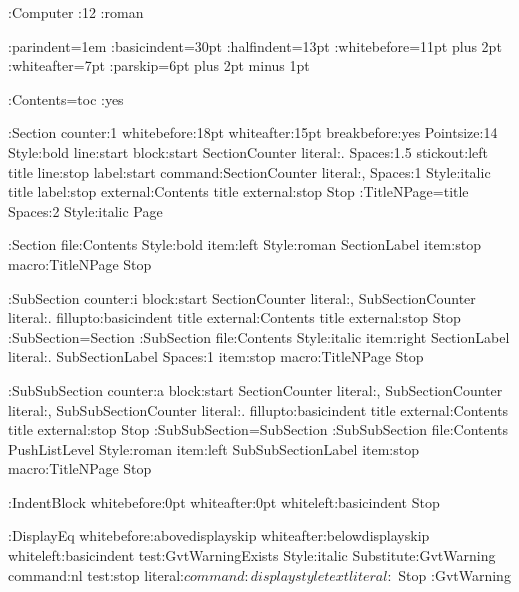 \StyleDefinition

%

%
%
%
%


\Typeface:Computer
\PointSize:12
\Style:roman

\Distance:parindent=1em
\Distance:basicindent=30pt
\Distance:halfindent=13pt
\Distance:whitebefore={11pt plus 2pt}
\Distance:whiteafter=7pt
\Distance:parskip={6pt plus 2pt minus 1pt}

\DefineExternalFile:Contents=toc
\WriteContents:yes

\DefineHeading:Section counter:1 whitebefore:18pt whiteafter:15pt
    breakbefore:yes
    Pointsize:14 Style:bold
    line:start block:start SectionCounter literal:. Spaces:1.5 stickout:left 
               title 
        line:stop
    label:start command:SectionCounter literal:, Spaces:1 
        Style:italic title
        label:stop
    external:Contents title external:stop
    Stop
\macro:TitleNPage=title Spaces:2 Style:italic Page \par
\DefineExternalItem:Section file:Contents Style:bold
    item:left Style:roman SectionLabel item:stop
    macro:TitleNPage
    Stop

\DefineHeading:SubSection counter:i
    block:start SectionCounter literal:, SubSectionCounter literal:.
          fillupto:basicindent title
    external:Contents title external:stop
    Stop
\GoverningCounter:SubSection=Section
\DefineExternalItem:SubSection  file:Contents Style:italic
    item:right SectionLabel literal:. 
               SubSectionLabel Spaces:1 item:stop
    macro:TitleNPage
    Stop

\DefineHeading:SubSubSection counter:a
    block:start SectionCounter literal:, SubSectionCounter literal:,
                SubSubSectionCounter literal:.
          fillupto:basicindent title
    external:Contents title external:stop
    Stop
\GoverningCounter:SubSubSection=SubSection
\DefineExternalItem:SubSubSection file:Contents PushListLevel Style:roman
    item:left SubSubSectionLabel item:stop
    macro:TitleNPage
    Stop

\DefineTextBlock:IndentBlock whitebefore:0pt whiteafter:0pt
    whiteleft:basicindent
    Stop

\DefineTextBlock:DisplayEq whitebefore:abovedisplayskip
    whiteafter:belowdisplayskip whiteleft:basicindent
    test:GvtWarningExists
        Style:italic Substitute:GvtWarning command:nl
        test:stop
    literal:$ command:displaystyle text literal:$
    Stop
\DefineSubstitution:GvtWarning

